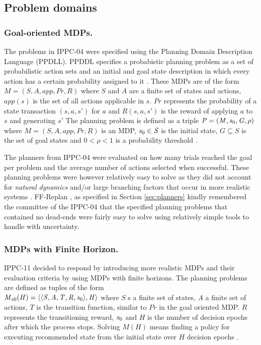 \documentclass[runningheads,a4paper]{llncs}
\begin{document}
\subsection{Problem domains}
\subsubsection{Goal-oriented MDPs. }The problems in IPPC-04 were specified using the Planning Domain Description Language (PPDLL). PPDDL specifies a probabistic planning problem as a set of probabilistic action sets and an initial and goal state description in which every action has a certain probability assigned to it \cite{FFReplan}. These MDPs are of the form $\mathit{M = (S, A, app, Pr, R)}$ where $\mathit{S}$ and $\mathit{A}$ are a finite set of states and actions, $\mathit{app(s)}$ is the set of all actions applicable in $\mathit{s}$. $\mathit{Pr}$ represents the probability of a state transaction $\mathit{(s, a, s')}$ for $\mathit{a}$ and $\mathit{R(s, a, s')}$ is the reward of applying $\mathit{a}$ to $\mathit{s}$ and generating $\mathit{s'}$ The planning problem is defined as a triple $\mathit{P = (M, s\textsubscript{0}, G, \rho)}$ where $\mathit{M = (S, A, app, Pr, R)}$ is an MDP, $\mathit{s\textsubscript{0} \in S}$ is the initial state, $\mathit{G \subseteq S}$ is the set of goal states and $\mathit{0 < \rho < 1}$ is a probability threshold \cite{teichteil2010incremental}.

 The planners from IPPC-04 were evaluated on how many trials reached the goal per problem and the average number of actions selected when successful. These planning problems were however relatively easy to solve as they did not account for \emph{natural dynamics} and/or large branching factors that occur in more realistic systems \cite{kolobov2012glutton}. FF-Replan \cite{FFReplan}, as specified in Section \ref{sec:planners} kindly remembered the committee of the IPPC-04 that the specified planning problems that contained no dead-ends were fairly easy to solve using relatively simple tools to handle with uncertainty.

\subsubsection{MDPs with Finite Horizon. }IPPC-11 decided to respond by introducing more realistic MDPs and their evaluation criteria by using MDPs with finite horizons. The planning problems are defined as tuples of the form \\ $\mathit{M\textsubscript{s0}(H) = \langle \langle S, A, T, R, s\textsubscript{0} \rangle , H \rangle }$ where $\mathit{S}$ s a finite set of states, $\mathit{A}$ a finite set of actions, $\mathit{T}$ is the transition function, similar to $\mathit{Pr}$ in the goal oriented MDP. $\mathit{R}$ represents the transitioning reward, $\mathit{s\textsubscript{0}}$ and $\mathit{H}$ is the number of decision epochs after which the process stops. Solving $\mathit{M(H)}$ means finding a policy for executing recommended state from the initial state over $\mathit{H}$ decision epochs \cite{kolobov2012gourmand}.
\end{document}
